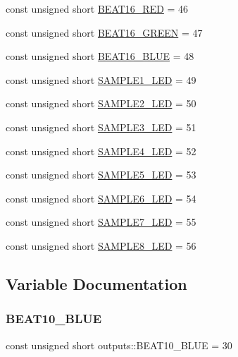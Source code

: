 \begin{DoxyCompactItemize}
\item 
const unsigned short \hyperlink{namespaceoutputs_a3dbc6b2fd920d581b752b72f86be3733}{B\+E\+A\+T16\+\_\+\+R\+ED} = 46
\item 
const unsigned short \hyperlink{namespaceoutputs_abb8efcc194a9934c26026a359edc8929}{B\+E\+A\+T16\+\_\+\+G\+R\+E\+EN} = 47
\item 
const unsigned short \hyperlink{namespaceoutputs_aaa4685feacdb3e8d2bb1c0435952e030}{B\+E\+A\+T16\+\_\+\+B\+L\+UE} = 48
\item 
const unsigned short \hyperlink{namespaceoutputs_a151156390f60151968f4092740d9d6b8}{S\+A\+M\+P\+L\+E1\+\_\+\+L\+ED} = 49
\item 
const unsigned short \hyperlink{namespaceoutputs_ae0776935fda36be3a645994d16591980}{S\+A\+M\+P\+L\+E2\+\_\+\+L\+ED} = 50
\item 
const unsigned short \hyperlink{namespaceoutputs_a8a0be2be0ae271cb8b57234a189b6689}{S\+A\+M\+P\+L\+E3\+\_\+\+L\+ED} = 51
\item 
const unsigned short \hyperlink{namespaceoutputs_a6fbee7a72f91577a7e1f072d00ad8d9f}{S\+A\+M\+P\+L\+E4\+\_\+\+L\+ED} = 52
\item 
const unsigned short \hyperlink{namespaceoutputs_a87e2d51fbeb2ac9fd23fc5d937b1c7c2}{S\+A\+M\+P\+L\+E5\+\_\+\+L\+ED} = 53
\item 
const unsigned short \hyperlink{namespaceoutputs_a7bdee2eb9fc676ac7edb9582334be15a}{S\+A\+M\+P\+L\+E6\+\_\+\+L\+ED} = 54
\item 
const unsigned short \hyperlink{namespaceoutputs_a3d438bc8ce91fb825bf2da7834ac639e}{S\+A\+M\+P\+L\+E7\+\_\+\+L\+ED} = 55
\item 
const unsigned short \hyperlink{namespaceoutputs_ac6e07c06d1d512716e6309db54648440}{S\+A\+M\+P\+L\+E8\+\_\+\+L\+ED} = 56
\end{DoxyCompactItemize}


\subsection{Variable Documentation}
\mbox{\label{namespaceoutputs_a188668f7db5d9610361658c817b08574}} 
\subsubsection{\texorpdfstring{B\+E\+A\+T10\+\_\+\+B\+L\+UE}{BEAT10\_BLUE}}
{\footnotesize\ttfamily const unsigned short outputs\+::\+B\+E\+A\+T10\+\_\+\+B\+L\+UE = 30}




